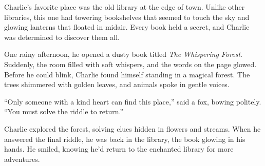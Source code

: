 \documentclass[12pt]{article}
\begin{document}
\begin{tcolorbox}[colframe=black!60, colback=white, 
coltitle=black, colbacktitle=black!15, fonttitle=\bfseries\Large, 
title=Text: The Enchanted Library, halign title=center, left=10pt, right=10pt, top=10pt, bottom=15pt]


Charlie’s favorite place was the old library at the edge of town. Unlike other libraries, this one had towering bookshelves that seemed to touch the sky and glowing lanterns that floated in midair. Every book held a secret, and Charlie was determined to discover them all.

One rainy afternoon, he opened a dusty book titled \textit{The Whispering Forest}. Suddenly, the room filled with soft whispers, and the words on the page glowed. Before he could blink, Charlie found himself standing in a magical forest. The trees shimmered with golden leaves, and animals spoke in gentle voices.

“Only someone with a kind heart can find this place,” said a fox, bowing politely. “You must solve the riddle to return.”

Charlie explored the forest, solving clues hidden in flowers and streams. When he answered the final riddle, he was back in the library, the book glowing in his hands. He smiled, knowing he’d return to the enchanted library for more adventures.

\end{tcolorbox}

\vspace{1em}
\end{document}
